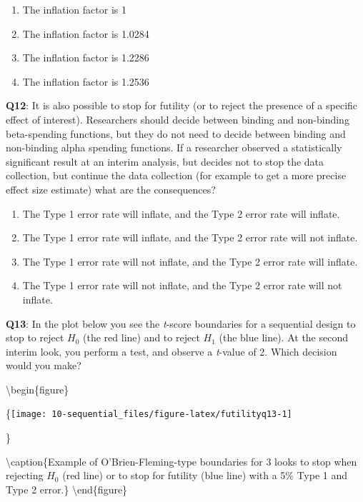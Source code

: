 \documentclass[
  oneside]{book}
\providecommand{\tightlist}{%
  \setlength{\itemsep}{0pt}\setlength{\parskip}{0pt}}
\begin{document}
\begin{enumerate}
\def\labelenumi{\Alph{enumi})}
\tightlist
\item
  The inflation factor is 1
\item
  The inflation factor is 1.0284
\item
  The inflation factor is 1.2286
\item
  The inflation factor is 1.2536
\end{enumerate}

\textbf{Q12}: It is also possible to stop for futility (or to reject the presence of a specific effect of interest). Researchers should decide between binding and non-binding beta-spending functions, but they do not need to decide between binding and non-binding alpha spending functions. If a researcher observed a statistically significant result at an interim analysis, but decides not to stop the data collection, but continue the data collection (for example to get a more precise effect size estimate) what are the consequences?

\begin{enumerate}
\def\labelenumi{\Alph{enumi})}
\tightlist
\item
  The Type 1 error rate will inflate, and the Type 2 error rate will inflate.
\item
  The Type 1 error rate will inflate, and the Type 2 error rate will not inflate.
\item
  The Type 1 error rate will not inflate, and the Type 2 error rate will inflate.
\item
  The Type 1 error rate will not inflate, and the Type 2 error rate will not inflate.
\end{enumerate}

\textbf{Q13}: In the plot below you see the \emph{t}-score boundaries for a sequential design to stop to reject \(H_0\) (the red line) and to reject \(H_1\) (the blue line). At the second interim look, you perform a test, and observe a \emph{t}-value of 2. Which decision would you make?

\textbackslash begin\{figure\}

\{\centering \texttt{[image: 10-sequential\_files/figure-latex/futilityq13-1]}

\}

\textbackslash caption\{Example of O'Brien-Fleming-type boundaries for 3 looks to stop when rejecting \(H_0\) (red line) or to stop for futility (blue line) with a 5\% Type 1 and Type 2 error.\}\label{fig:futilityq13}
\textbackslash end\{figure\}
\end{document}

